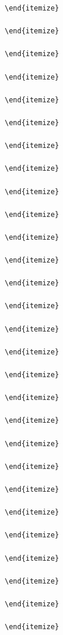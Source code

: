 \begin{itemize}
\begin{itemize}
\begin{itemize}
\begin{itemize}
\begin{itemize}
\begin{itemize}
\begin{enumerate}
\begin{enumerate}
\begin{enumerate}
\begin{enumerate}
\begin{lstlisting}[language=Python]
\end{itemize}

\end{itemize}

\end{itemize}

\end{itemize}

\end{itemize}

\end{itemize}

\end{itemize}

\end{itemize}

\end{itemize}

\end{itemize}

\end{itemize}

\end{itemize}

\end{itemize}

\end{itemize}

\end{itemize}

\end{itemize}

\end{itemize}

\end{itemize}

\end{itemize}

\end{itemize}

\end{itemize}

\end{itemize}

\end{itemize}

\end{itemize}

\end{itemize}

\end{itemize}

\end{itemize}

\end{itemize}


\end{lstlisting}
\end{enumerate}
\end{enumerate}
\end{enumerate}
\end{enumerate}
\end{itemize}
\end{itemize}
\end{itemize}
\end{itemize}
\end{itemize}
\end{itemize}

